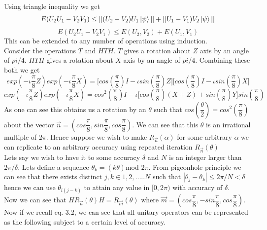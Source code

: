 \documentclass{report}
\begin{document}
Using triangle inequality we get
\begin{equation}E(U_{2}U_{1} - V_{2}V_{1}) \leq ||(U_{2} - V_{2})U_{1}\ket{\psi}|| + ||U_{1} - V_{1})V_{2}\ket{\psi}||\end{equation}
\begin{equation}E(U_{2}U_{1} - V_{2}V_{1}) \leq E(U_2,V_2) + E(U_1,V_1)\end{equation}
This can be extended to any number of operations using induction.\\
Consider the operations $T$ and $HTH$. $T$ gives a rotation about $Z$ axis by an angle of $pi/4$. $HTH$ gives a rotation about $X$ axis by an angle of $pi/4$. Combining these both we get
\begin{equation}
exp(-\iota\dfrac{\pi}{8}Z)exp(-\iota\dfrac{\pi}{8}X) = \Big[cos\left(\dfrac{\pi}{8}\right)I - {\iota}sin\left(\dfrac{\pi}{8}\right)Z\Big]\Big[cos\left(\dfrac{\pi}{8}\right)I - {\iota}sin\left(\dfrac{\pi}{8}\right)X\Big]
\end{equation}
\begin{equation}
exp(-\iota\dfrac{\pi}{8}Z)exp(-\iota\dfrac{\pi}{8}X) = {cos}^2\left(\dfrac{\pi}{8}\right)I - \iota\Big[cos\left(\dfrac{\pi}{8}\right)(X + Z) + sin\left(\dfrac{\pi}{8}\right)Y\Big]sin\left(\dfrac{\pi}{8}\right)
\end{equation}
As one can see this obtains us a rotation by an $\theta$  such that $cos\left(\dfrac{\theta}{2}\right) = {cos}^2\left(\dfrac{\pi}{8}\right)$ about the vector $\vec{n} = \left(cos\dfrac{\pi}{8},sin\dfrac{\pi}{8},cos\dfrac{\pi}{8}\right)$. We can see that this $\theta$ is an irrational multiple of $2\pi$. Hence suppose we wish to make $R_{\vec{n}}(\alpha)$ for some arbitrary $\alpha$ we can replicate to an arbitrary accuracy using repeated iteration $R_{\vec{n}}(\theta)$\\
Lets say we wish to have it to some accuracy $\delta$ and $N$ is an integer larger than $2\pi/\delta$. Lets define a sequence $\theta_k = (k\theta)$mod $2\pi$. From pigeonhole principle we can see that there exists distinct $j,k \in{1,2,.....N}$ such that $|\theta_j - \theta_k| \leq 2\pi/N < \delta$ hence we can use $\theta_{l(j-k)}$ to attain any value in $[0, 2\pi)$ with accuracy of $\delta$.\\
Now we can see that $HR_{\vec{n}}(\theta)H = R_{\vec{m}}(\theta)$ where $\vec{m} = \left(cos\dfrac{\pi}{8},-sin\dfrac{\pi}{8},cos\dfrac{\pi}{8}\right)$. Now if we recall eq. 3.2, we can see that all unitary operators can be represented as the following subject to a certain level of accuracy.
\end{document}
